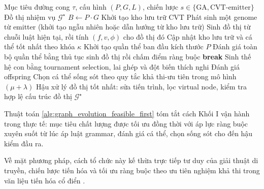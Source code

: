 \documentclass[oneside,a4paper,12pt]{extreport}
\begin{document}
\begin{algorithm}[H]
\caption{Sinh đồ thị nhiệm vụ bằng GA hoặc CVT-emitter với ưu tiên nghiệm khả thi}
\label{alg:graph_evolution_feasible_first}
\begin{algorithmic}[1]
\Require Mục tiêu đường cong $\tau$, cấu hình $(P,G,L)$, chiến lược $s\in\{\text{GA},\text{CVT-emitter}\}$
\Ensure Đồ thị nhiệm vụ $\mathcal{G}^{\star}$
  \State $B \gets P\cdot G$ 
  \State Khởi tạo kho lưu trữ CVT
    \State Phát sinh một genome từ emitter (khởi tạo ngẫu nhiên hoặc dẫn hướng từ kho lưu trữ)
    \State Sinh đồ thị từ chuỗi luật hiện tại, rồi tính $(f,v,\phi)$ cho đồ thị đó
    \State Cập nhật kho lưu trữ và cá thể tốt nhất theo khóa $\kappa$
  \EndFor
\Else
  \State Khởi tạo quần thể ban đầu kích thước $P$
    \State Đánh giá toàn bộ quần thể bằng thủ tục sinh đồ thị rồi chấm điểm ràng buộc
      \State \textbf{break} 
    \EndIf
    \State Sinh thế hệ con bằng tournament selection, lai ghép và đột biến thích nghi
    \State Đánh giá offspring
    \State Chọn cá thể sống sót theo quy tắc khả thi-ưu tiên trong mô hình $(\mu+\lambda)$
  \EndFor
\EndIf
\State Hậu xử lý đồ thị tốt nhất: sửa tiến trình, lọc virtual node, kiểm tra hợp lệ cấu trúc đồ thị
\State \Return $\mathcal{G}^{\star}$
\end{algorithmic}
\end{algorithm}

Thuật toán \ref{alg:graph_evolution_feasible_first} tóm tắt cách Khối I vận hành trong thực tế: mục tiêu chất lượng được tối ưu đồng thời với áp lực ràng buộc xuyên suốt từ lúc áp luật grammar, đánh giá cá thể, chọn sống sót cho đến hậu kiểm đầu ra.

Về mặt phương pháp, cách tổ chức này kế thừa trực tiếp tư duy của giải thuật di truyền, chiến lược tiến hóa và tối ưu ràng buộc theo ưu tiên nghiệm khả thi trong văn liệu tiến hóa cổ điển \cite{goldberg1989genetic,beyer2002evolution,deb2000constraint}.
\end{document}
